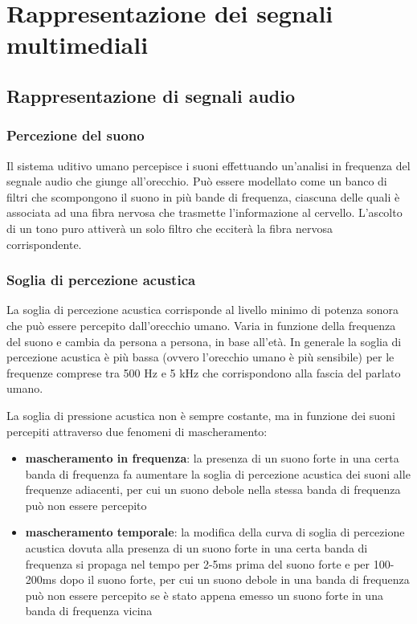 \section{Rappresentazione dei segnali multimediali}
\subsection{Rappresentazione di segnali audio}
\subsubsection*{Percezione del suono}
Il sistema uditivo umano percepisce i suoni effettuando un'analisi in frequenza del segnale audio che giunge all'orecchio.
Può essere modellato come un banco di filtri che scompongono il suono in più bande di frequenza, ciascuna delle quali
è associata ad una fibra nervosa che trasmette l'informazione al cervello. L'ascolto di un tono puro attiverà un solo
filtro che ecciterà la fibra nervosa corrispondente.

\subsubsection*{Soglia di percezione acustica}
La soglia di percezione acustica corrisponde al livello minimo di potenza sonora che può essere percepito dall'orecchio
umano. Varia in funzione della frequenza del suono e cambia da persona a persona, in base all'età. In generale la soglia
di percezione acustica è più bassa (ovvero l'orecchio umano è più sensibile) per le frequenze comprese tra 500 Hz e 5 kHz
che corrispondono alla fascia del parlato umano.

La soglia di pressione acustica non è sempre costante, ma in funzione dei suoni percepiti attraverso due fenomeni di mascheramento:
\begin{itemize}
	\item \textbf{mascheramento in frequenza}: la presenza di un suono forte in una certa banda di frequenza fa aumentare
	la soglia di percezione acustica dei suoni alle frequenze adiacenti, per cui un suono debole nella stessa banda di
	frequenza può non essere percepito
	\item \textbf{mascheramento temporale}: la modifica della curva di soglia di percezione acustica dovuta alla presenza
	di un suono forte in una certa banda di frequenza si propaga nel tempo per 2-5ms prima del suono forte e per 100-200ms
	dopo il suono forte, per cui un suono debole in una banda di frequenza può non essere percepito se è stato appena emesso
	un suono forte in una banda di frequenza vicina
\end{itemize}

